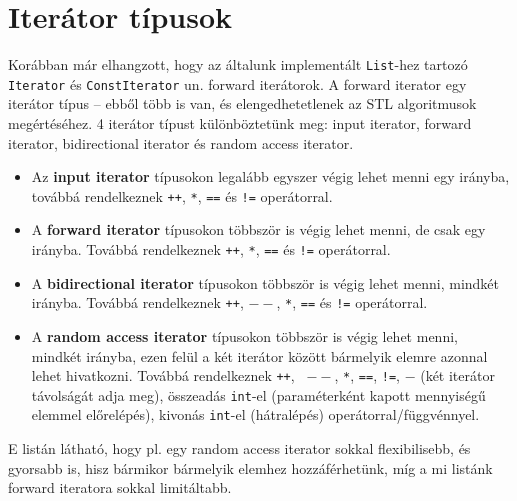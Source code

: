 \documentclass[a4paper,11.5pt]{article}
\begin{document}
	\section{Iterátor típusok}
	Korábban már elhangzott, hogy az általunk implementált \texttt{List}-hez tartozó \texttt{Iterator} és \texttt{ConstIterator} un. forward iterátorok. A forward iterator egy iterátor típus -- ebből több is van, és elengedhetetlenek az STL algoritmusok megértéséhez. 4 iterátor típust különböztetünk meg: input iterator, forward iterator, bidirectional iterator és random access iterator.
	\begin{itemize}
		\item Az \textbf{input iterator} típusokon legalább egyszer végig lehet menni egy irányba, továbbá rendelkeznek \texttt{++}, \texttt{*}, \texttt{==} és \texttt{!=} operátorral.
		\item A \textbf{forward iterator} típusokon többször is végig lehet menni, de csak egy irányba. Továbbá rendelkeznek \texttt{++}, \texttt{*}, \texttt{==} és \texttt{!=} operátorral.
		\item A \textbf{bidirectional iterator} típusokon többször is végig lehet menni, mindkét irányba. Továbbá rendelkeznek \texttt{++}, \texttt{$--$}, \texttt{*}, \texttt{==} és \texttt{!=} operátorral.
		\item A \textbf{random access iterator} típusokon többször is végig lehet menni, mindkét irányba, ezen felül a két iterátor között bármelyik elemre azonnal lehet hivatkozni. Továbbá rendelkeznek \texttt{++}, \texttt{
		$--$}, \texttt{*}, \texttt{==}, \texttt{!=}, \texttt{$-$} (két iterátor távolságát adja meg), összeadás \texttt{int}-el (paraméterként kapott mennyiségű elemmel előrelépés), kivonás \texttt{int}-el (hátralépés) operátorral/függvénnyel.
	\end{itemize}
	E listán látható, hogy pl. egy random access iterator sokkal flexibilisebb, és gyorsabb is, hisz bármikor bármelyik elemhez hozzáférhetünk, míg a mi listánk forward iteratora sokkal limitáltabb.
	
\end{document}
